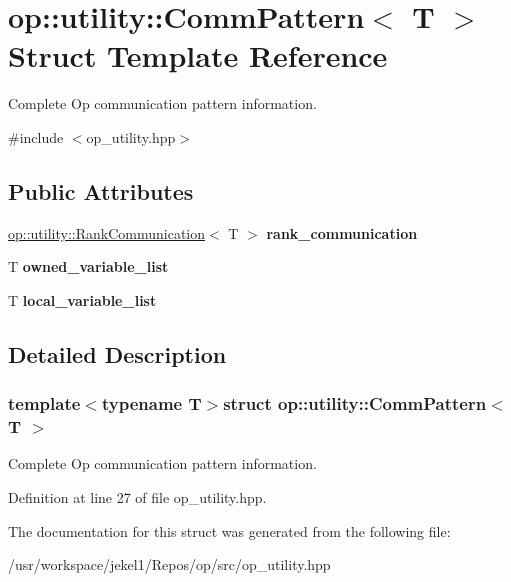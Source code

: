 \hypertarget{structop_1_1utility_1_1CommPattern}{\section{op\-:\-:utility\-:\-:Comm\-Pattern$<$ T $>$ Struct Template Reference}
\label{structop_1_1utility_1_1CommPattern}
}


Complete Op communication pattern information.  




{\ttfamily \#include $<$op\-\_\-utility.\-hpp$>$}

\subsection*{Public Attributes}
\begin{DoxyCompactItemize}
\item 
\hypertarget{structop_1_1utility_1_1CommPattern_a2d9393e045acca12d28f6d4df0791753}{\hyperlink{structop_1_1utility_1_1RankCommunication}{op\-::utility\-::\-Rank\-Communication}$<$ T $>$ {\bfseries rank\-\_\-communication}}\label{structop_1_1utility_1_1CommPattern_a2d9393e045acca12d28f6d4df0791753}

\item 
\hypertarget{structop_1_1utility_1_1CommPattern_ab4b4dca35dd456d8562a8047a1d78d52}{T {\bfseries owned\-\_\-variable\-\_\-list}}\label{structop_1_1utility_1_1CommPattern_ab4b4dca35dd456d8562a8047a1d78d52}

\item 
\hypertarget{structop_1_1utility_1_1CommPattern_a4ee8ee3d5001e9d1e10ffb2b4db7ffff}{T {\bfseries local\-\_\-variable\-\_\-list}}\label{structop_1_1utility_1_1CommPattern_a4ee8ee3d5001e9d1e10ffb2b4db7ffff}

\end{DoxyCompactItemize}


\subsection{Detailed Description}
\subsubsection*{template$<$typename T$>$struct op\-::utility\-::\-Comm\-Pattern$<$ T $>$}

Complete Op communication pattern information. 

Definition at line 27 of file op\-\_\-utility.\-hpp.



The documentation for this struct was generated from the following file\-:\begin{DoxyCompactItemize}
\item 
/usr/workspace/jekel1/\-Repos/op/src/op\-\_\-utility.\-hpp\end{DoxyCompactItemize}
